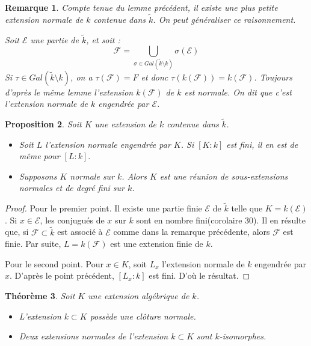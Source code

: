 \documentclass[12pt,a4paper]{report}
\newtheorem{thm}{\bf Th\'eor\`eme}
\newtheorem{prop}[thm]{\bf Proposition}
\newtheorem{rem}[thm]{Remarque}
\begin{document}
\begin{rem}\rm
Compte tenue du lemme précédent, il existe une plus petite extension normale de $k$ contenue dans $\tilde{k}$. On peut généraliser ce raisonnement. 

Soit $\mathcal{E}$ une partie de $\tilde{k}$, et soit : 
$$\mathcal{F}=\bigcup_{\sigma \in Gal(\tilde{k}\setminus k)}\sigma(\mathcal{E})$$
Si $\tau \in Gal(\tilde{k}\setminus k)$, on a $\tau(\mathcal{F})=F$ et donc $\tau(k(\mathcal{F}))=k(\mathcal{F})$. Toujours d'après le même lemme l'extension $k(\mathcal{F})$ de $k$ est normale. On dit que c'est l'extension normale de $k$ engendrée par $\mathcal{E}$. 

\end{rem}

\begin{prop}\rm
Soit $K$ une extension de $k$ contenue dans $\tilde{k}$. 

\begin{itemize}
\item Soit $L$ l'extension normale engendrée par $K$. Si $[K:k]$ est fini, il en est de même pour $[L:k].$
\item Supposons $K$ normale sur $k$. Alors $K$ est une réunion de sous-extensions normales et de degré fini sur $k$. 
\end{itemize}

\end{prop}

\begin{proof}
Pour le premier point. Il existe une partie finie $\mathcal{E}$ de $\tilde{k}$ telle que $K=k(\mathcal{E})$. Si $x\in \mathcal{E}$, les conjugués de $x$ sur $k$ sont en nombre fini(corolaire 30). Il en résulte que, si $\mathcal{F}\subset \tilde{k}$ est associé à $\mathcal{E}$ comme dans la remarque précédente, alors $\mathcal{F}$ est finie. Par suite, $L=k(\mathcal{F})$ est une extension finie de $k$.

Pour le second point. Pour $x\in K$, soit $L_x$ l'extension normale de $k$ engendrée par $x$. D'après le point précédent, $[L_x:k]$ est fini. D'où le résultat.  
\end{proof}

\begin{thm}\rm
Soit $K$ une extension algébrique de $k$. 
\begin{itemize}
\item L'extension $k\subset K$ possède une clôture normale.
\item Deux extensions normales de l'extension $k\subset K$ sont $k$-isomorphes. 
\end{itemize}
\end{thm}
\end{document}
